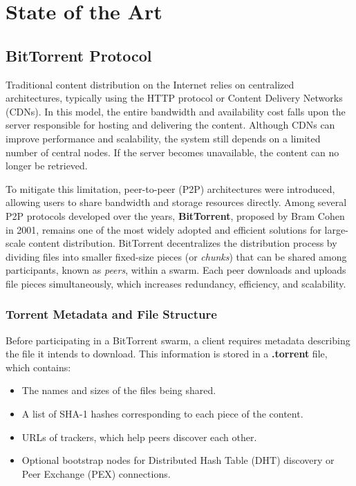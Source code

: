 \chapter{State of the Art}
\label{state_of_art}

\section{BitTorrent Protocol}
\label{BitTorrent}

Traditional content distribution on the Internet relies on centralized architectures, typically using the HTTP protocol or Content Delivery Networks (CDNs). In this model, the entire bandwidth and availability cost falls upon the server responsible for hosting and delivering the content. Although CDNs can improve performance and scalability, the system still depends on a limited number of central nodes. If the server becomes unavailable, the content can no longer be retrieved.

To mitigate this limitation, peer-to-peer (P2P) architectures were introduced, allowing users to share bandwidth and storage resources directly. Among several P2P protocols developed over the years, \textbf{BitTorrent}, proposed by Bram Cohen in 2001, remains one of the most widely adopted and efficient solutions for large-scale content distribution. BitTorrent decentralizes the distribution process by dividing files into smaller fixed-size pieces (or \textit{chunks}) that can be shared among participants, known as \textit{peers}, within a swarm. Each peer downloads and uploads file pieces simultaneously, which increases redundancy, efficiency, and scalability.

\subsection{Torrent Metadata and File Structure}
\label{torrent_structure}

Before participating in a BitTorrent swarm, a client requires metadata describing the file it intends to download. This information is stored in a \textbf{.torrent} file, which contains:
\begin{itemize}
    \item The names and sizes of the files being shared.
    \item A list of SHA-1 hashes corresponding to each piece of the content.
    \item URLs of trackers, which help peers discover each other.
    \item Optional bootstrap nodes for Distributed Hash Table (DHT) discovery or Peer Exchange (PEX) connections.
\end{itemize}

